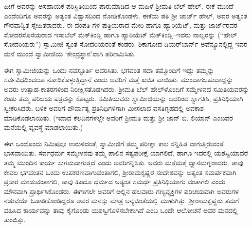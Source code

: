 ಹೀಗೆ ಅವರನ್ನು ಅಸಹಾಯಕ ಪರಿಸ್ಥಿತಿಯಿಂದ ಪಾರುಮಾಡಿದ ಆ ಮಹಿಳೆ ಶ್ರೀಮತಿ ಬೆಲ್ ಹೇಲ್. ಈಕೆ ಮುಂದೆ ಎಂದೆಂದಿಗೂ ಅವರನ್ನು ಅತ್ಯಂತ ವಿಶ್ವಾಸದಿಂದ ನೋಡಿಕೊಂಡಳು. ಈಕೆಯ ಪತಿ ಶ್ರೀ ಜಾರ್ಜ್ ಹೇಲ್, ಅವರ ಅತ್ಯಂತ ಗೌರವಾನ್ವಿತ ಸ್ನೇಹಿತರಾದರು. ಈ ದಂಪತಿ ಗಳ ಪುತ್ರಿಯರಾದ ಮೇರಿ ಹಾಗೂ ಹ್ಯಾರಿಯೆಟ್, ಮತ್ತು ಜಾರ್ಜ್​ರವರ ಸೋದರಸೊಸೆಯರಾದ ಇಸಾಬೆಲ್ ಮೆಕ್​ಕಿಂಡ್ಲಿ ಹಾಗೂ ಹ್ಯಾರಿಯೆಟ್ ಮೆಕ್​ಕಿಂಡ್ಲಿ–ಇವರು ನಾಲ್ವರನ್ನು (“ಹೇಲ್ ಸೋದರಿಯರು”) ಸ್ವಾಮೀಜಿ ಸ್ವಂತ ಸೋದರಿಯರಂತೆ ಕಂಡರು. ಶಿಕಾಗೋದ ಡಿಯರ್​ಬಾರ್ನ್ ಅವೆನ್ಯೂನಲ್ಲಿದ್ದ ಇವರ ಮನೆ ಮುಂದೆ ಸ್ವಾಮೀಜಿಯ ‘ಕೇಂದ್ರಸ್ಥಾನ’ವಾಗಿ ಪರಿಣಮಿಸಿತು.

ಈಗ ಸ್ವಾಮೀಜಿಯನ್ನು ಒಂದು ನವಸ್ಫೂರ್ತಿ ಆವರಿಸಿತು. ಭಗವಂತ ಸದಾ ತಮ್ಮೊಂದಿಗೆ ಇದ್ದು ತಮ್ಮನ್ನು ಸರ್ವವಿಧದಿಂದಲೂ ನೋಡಿಕೊಳ್ಳುತ್ತಿದ್ದಾನೆ ಎಂದು ಅವರಿಗೆ ಮತ್ತೆ ಖಚಿತ ವಾಯಿತು. ಮುಂದಾಗಬಹುದಾದ್ದನ್ನು ಅವರು ಉತ್ಸಾಹ-ಕಾತರಗಳಿಂದ ನಿರೀಕ್ಷಿಸತೊಡಗಿದರು. ಶ್ರೀಮತಿ ಬೆಲ್ ಹೇಲ್​ಳೊಂದಿಗೆ ಸಮ್ಮೇಳನದ ಸಮಿತಿಯವರನ್ನು ಕಂಡು ತಮ್ಮ ಪರಿಚಯ ಪತ್ರವನ್ನು ಕೊಟ್ಟರು. ಸಮಿತಿಯವರು ಸ್ವಾಮೀಜಿಯನ್ನು ಆದರಿಂದ ಸ್ವಾಗತಿಸಿ, ಪ್ರತಿನಿಧಿಯಾಗಿ ಸ್ವೀಕರಿಸಿದರು. ಬಳಿಕ ಅವರಿಗೆ ಪೌರ್ವಾತ್ಯ ಪ್ರತಿನಿಧಿಗಳಿಗಾಗಿ ಮೀಸಲಾದ ವಸತಿಗೃಹದಲ್ಲಿ ಅವಕಾಶ ಮಾಡಿಕೊಡಲಾಯಿತು. (ಇದಾದ ಕೆಲದಿನಗಳಲ್ಲೇ ಅವರಿಗೆ ಶ್ರೀಮತಿ ಮತ್ತು ಶ್ರೀ ಜಾನ್ ಬಿ. ಲಿಯಾನ್ ಎಂಬವರ ಮನೆಯಲ್ಲಿ ವ್ಯವಸ್ಥೆ ಮಾಡಲಾಯಿತು.)

ಈಗ ಒಂದೊಂದು ನಿಮಿಷವೂ ಉರುಳಿದಂತೆ, ಸ್ವಾಮೀಜಿಗೆ ತಮ್ಮ ಪರೀಕ್ಷಾ ಕಾಲ ಸನ್ನಿಹಿತ ವಾಗುತ್ತಿರುವಂತೆ ಭಾಸವಾಯಿತು. ಸರ್ವಧರ್ಮ ಸಮ್ಮೇಳನವು ತಮ್ಮ ಪಾಲಿನ ಸತ್ವಪರೀಕ್ಷೆ ಯಾಗಲಿದೆ, ಹಾಗೂ ಇದರಲ್ಲಿ ಯಶಸ್ವಿಯಾದರೆ ತಮ್ಮ ಮುಂದಿನ ಕಾರ್ಯ ಸುಗಮವಾಗುತ್ತದೆ ಎಂದು ಅವರಿಗನ್ನಿಸಿತು. ಅವರು ಮತ್ತೆಮತ್ತೆ ಧ್ಯಾನಮಗ್ನರಾದರು. ತಾವು ಕೇವಲ ಭಗವಂತನ ಒಂದು ಉಪಕರಣವಾಗುವಂತಾಗಲಿ, ಶ್ರೀರಾಮಕೃಷ್ಣರ ಸಂದೇಶವನ್ನು ಅತ್ಯಂತ ಸಮರ್ಪಕವಾಗಿ ಪ್ರಸಾರ ಮಾಡುವಂತಾಗಲಿ, ತಾವು ಹಿಂದೂ ಧರ್ಮದ ಅತ್ಯಂತ ಸಮರ್ಥ ಪ್ರತಿನಿಧಿಯಾಗು ವಂತಾಗಲಿ ಎಂದು ಮೌನವಾಗಿ ಪ್ರಾರ್ಥಿಸಿಕೊಂಡರು. ಈಗಾಗಲೇ ಅವರಿಗೆ ಅಲ್ಲಿನ ಹಲವಾರು ಗಣ್ಯವ್ಯಕ್ತಿಗಳ ಪರಿಚಯವಾಗಿ ಅವರುಗಳ ನಡುವೆಯೇ ಓಡಾಡಿಕೊಂಡಿದ್ದರೂ ಅವರ ಮನಸ್ಸು ಮಾತ್ರ ಅನ್ಯಚಿಂತೆಯಲ್ಲಿ ಮುಳುಗಿತ್ತು. ಶ್ರೀರಾಮಕೃಷ್ಣರು ತಮಗೆ ವಹಿಸಿದ ಕಾರ್ಯವನ್ನು ತಾವು ಕೈಗೊಂಡು ಯಶಸ್ವಿಗೊಳಿಸಬೇಕಾಗಿದೆ ಎಂಬ ಒಂದೇ ಆಲೋಚನೆ ಅವರ ಮನದಲ್ಲಿ ತುಂಬಿತ್ತು.

